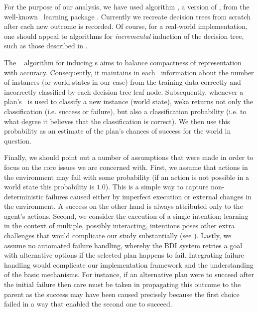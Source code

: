 For the purpose of our analysis, we have used algorithm
, a version of  \cite{Mitchell97:ML}, from the
well-known \weka\ learning package \cite{weka99}. Currently we
recreate decision trees from scratch after each new outcome is recorded.
Of course, for a real-world implementation, one should appeal to algorithms for
\emph{incremental} induction of the decision tree, such as those described in
\cite{Swere06:Fast,Utgoff97Decision}.

The \weka\  algorithm for inducing \dt{}s aims to balance
compactness of representation with accuracy. Consequently, it maintains in each
\dt\ information about the number of instances (or world states in our case) from
the training data correctly and incorrectly classified by each decision tree leaf
node. Subsequently, whenever a plan's \dt\ is used to classify a new instance
(world state), weka returns not only the classification (i.e. success or
failure), but also a classification probability (i.e. to what degree it believes
that the classification is correct). We then use this probability as an estimate
of the plan's chances of success for the world in question.


Finally, we should point out a number of assumptions that were made in order to
focus on the core issues we are concerned with.
First, we assume that actions in the environment may fail with some probability
(if an action is not possible in a world state this probability is $1.0$).
This is a simple way to capture non-deterministic failures caused either by 
imperfect execution or external changes in the environment. A success on the
other hand is always attributed only to the agent's actions.
Second, we consider the execution of a single intention; learning in the context
of multiple, possibly interacting, intentions poses other extra challenges that
would complicate our study substantially (see \cite{Thangarajah02}).
Lastly, we assume no automated failure handling, whereby the BDI system retries
a goal with alternative options if the selected plan happens to fail. 
Integrating failure handling would complicate our implementation framework and the understanding of the basic mechanisms. For instance, if an alternative plan were to succeed after the initial failure then care must be taken in propagating this outcome to the parent as the success may have been caused precisely because the first choice failed in a way that enabled the second one to succeed.



